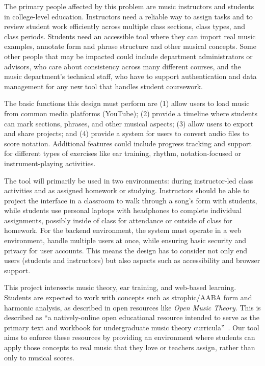 \documentclass[12pt, letterpaper]{article}
\begin{document}
The primary people affected by this problem are music instructors and students in college-level education. Instructors need a reliable way to assign tasks and to review student work efficiently across multiple class sections, class types, and class periods. Students need an accessible tool where they can import real music examples, annotate form and phrase structure and other musical concepts. Some other people that may be impacted could include department administrators or advisors, who care about consistency across many different courses, and the music department's technical staff, who have to support authentication and data management for any new tool that handles student coursework.

The basic functions this design must perform are (1) allow users to load music from common media platforms (YouTube); (2) provide a timeline where students can mark sections, phrases, and other musical aspects; (3) allow users to export and share projects; and (4) provide a system for users to convert audio files to score notation. Additional features could include progress tracking and support for different types of exercises like ear training, rhythm, notation-focused or instrument-playing activities.

The tool will primarily be used in two environments: during instructor-led class activities and as assigned homework or studying. Instructors should be able to project the interface in a classroom to walk through a song's form with students, while students use personal laptops with headphones to complete individual assignments, possibly inside of class for attendance or outside of class for homework. For the backend environment, the system must operate in a web environment, handle multiple users at once, while ensuring basic security and privacy for user accounts. This means the design has to consider not only end users (students and instructors) but also aspects such as accessibility and browser support.

This project intersects music theory, ear training, and web-based learning. Students are expected to work with concepts such as strophic/AABA form and harmonic analysis, as described in open resources like \emph{Open Music Theory}. This is described as ``a natively-online open educational resource intended to serve as the primary text and workbook for undergraduate music theory curricula''~\cite{omt}. Our tool aims to enforce these resources by providing an environment where students can apply those concepts to real music that they love or teachers assign, rather than only to musical scores.
\end{document}
